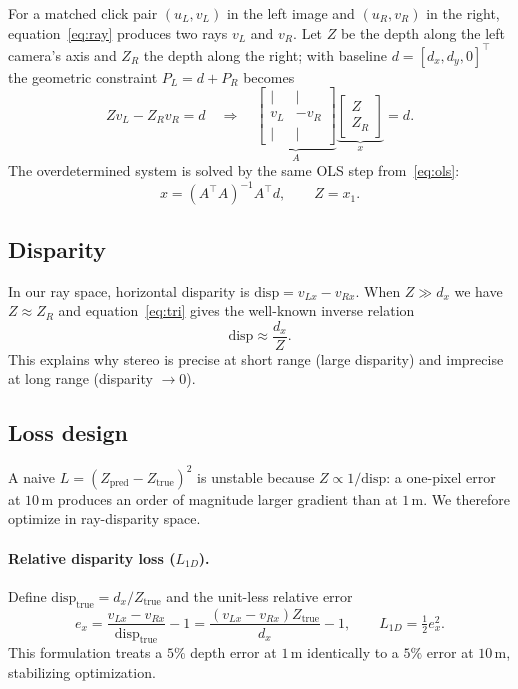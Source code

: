 \documentclass[11pt]{article}
\begin{document}
For a matched click pair $(u_L, v_L)$ in the left image and $(u_R, v_R)$ in the right,
equation~\eqref{eq:ray} produces two rays $v_L$ and $v_R$. Let $Z$ be the depth along the
left camera's axis and $Z_R$ the depth along the right; with baseline $d = [d_x, d_y, 0]^\top$
the geometric constraint $P_L = d + P_R$ becomes
\begin{equation}
Z v_L - Z_R v_R = d \quad\Longrightarrow\quad
\underbrace{\begin{bmatrix} | & | \\ v_L & -v_R \\ | & | \end{bmatrix}}_{A}
\underbrace{\begin{bmatrix} Z \\ Z_R \end{bmatrix}}_{x} = d.
\end{equation}
The overdetermined system is solved by the same OLS step from~\eqref{eq:ols}:
\begin{equation}
x = (A^\top A)^{-1} A^\top d, \qquad Z = x_1.
\label{eq:tri}
\end{equation}

\subsection{Disparity}

In our ray space, horizontal disparity is $\text{disp} = v_{Lx} - v_{Rx}$. When $Z \gg
d_x$ we have $Z \approx Z_R$ and equation~\eqref{eq:tri} gives the well-known inverse
relation
\begin{equation}
\text{disp} \approx \frac{d_x}{Z}.
\end{equation}
This explains why stereo is precise at short range (large disparity) and imprecise at long
range (disparity $\to 0$).

\subsection{Loss design}

A naive $L = (Z_\text{pred} - Z_\text{true})^2$ is unstable because $Z \propto
1/\text{disp}$: a one-pixel error at $10$\,m produces an order of magnitude larger
gradient than at $1$\,m. We therefore optimize in ray-disparity space.

\paragraph{Relative disparity loss ($L_{1D}$).} Define $\text{disp}_\text{true} = d_x /
Z_\text{true}$ and the unit-less relative error
\begin{equation}
e_x = \frac{v_{Lx} - v_{Rx}}{\text{disp}_\text{true}} - 1 = \frac{(v_{Lx} - v_{Rx}) Z_\text{true}}{d_x} - 1,
\qquad L_{1D} = \tfrac{1}{2} e_x^2.
\label{eq:l1d}
\end{equation}
This formulation treats a $5\%$ depth error at $1$\,m identically to a $5\%$ error at
$10$\,m, stabilizing optimization.
\end{document}
